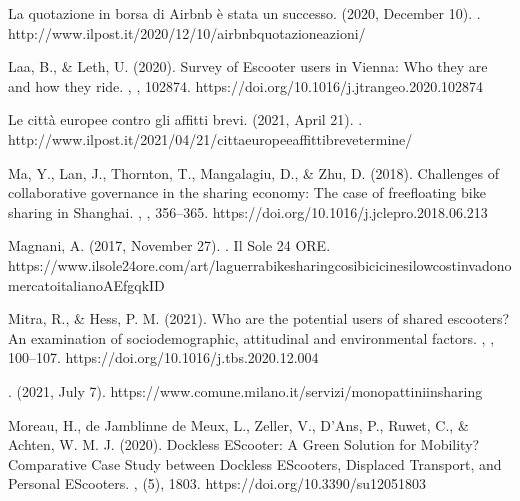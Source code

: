 \documentclass[letterpaper,10pt,english]{jupyterBook}
\begin{document}
\sphinxAtStartPar
La quotazione in borsa di Airbnb è stata un successo. (2020, December 10). . http://www.ilpost.it/2020/12/10/airbnb\sphinxhyphen{}quotazione\sphinxhyphen{}azioni/

\sphinxAtStartPar
Laa, B., \& Leth, U. (2020). Survey of E\sphinxhyphen{}scooter users in Vienna: Who they are and how they ride. , , 102874. https://doi.org/10.1016/j.jtrangeo.2020.102874

\sphinxAtStartPar
Le città europee contro gli affitti brevi. (2021, April 21). . http://www.ilpost.it/2021/04/21/citta\sphinxhyphen{}europee\sphinxhyphen{}affitti\sphinxhyphen{}breve\sphinxhyphen{}termine/

\sphinxAtStartPar
Ma, Y., Lan, J., Thornton, T., Mangalagiu, D., \& Zhu, D. (2018). Challenges of collaborative governance in the sharing economy: The case of free\sphinxhyphen{}floating bike sharing in Shanghai. , , 356–365. https://doi.org/10.1016/j.jclepro.2018.06.213

\sphinxAtStartPar
Magnani, A. (2017, November 27). . Il Sole 24 ORE. https://www.ilsole24ore.com/art/la\sphinxhyphen{}guerra\sphinxhyphen{}bike\sphinxhyphen{}sharing\sphinxhyphen{}cosi\sphinxhyphen{}bici\sphinxhyphen{}cinesi\sphinxhyphen{}low\sphinxhyphen{}cost\sphinxhyphen{}invadono\sphinxhyphen{}mercato\sphinxhyphen{}italiano\sphinxhyphen{}AEfgqkID

\sphinxAtStartPar
Mitra, R., \& Hess, P. M. (2021). Who are the potential users of shared e\sphinxhyphen{}scooters? An examination of socio\sphinxhyphen{}demographic, attitudinal and environmental factors. , , 100–107. https://doi.org/10.1016/j.tbs.2020.12.004

\sphinxAtStartPar
{}. (2021, July 7). https://www.comune.milano.it/servizi/monopattini\sphinxhyphen{}in\sphinxhyphen{}sharing

\sphinxAtStartPar
Moreau, H., de Jamblinne de Meux, L., Zeller, V., D’Ans, P., Ruwet, C., \& Achten, W. M. J. (2020). Dockless E\sphinxhyphen{}Scooter: A Green Solution for Mobility? Comparative Case Study between Dockless E\sphinxhyphen{}Scooters, Displaced Transport, and Personal E\sphinxhyphen{}Scooters. , (5), 1803. https://doi.org/10.3390/su12051803
\end{document}
